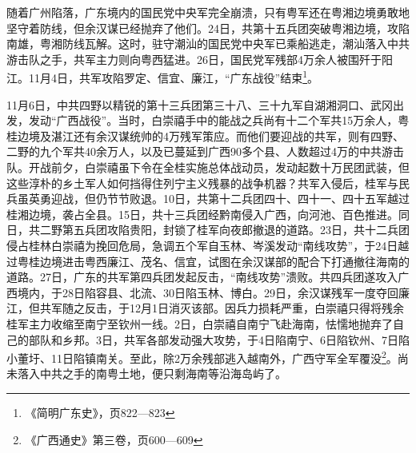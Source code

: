 随着广州陷落，广东境内的国民党中央军完全崩溃，只有粤军还在粤湘边境勇敢地坚守着防线，但余汉谋已经抛弃了他们。24日，共第十五兵团突破粤湘边境，攻陷南雄，粤湘防线瓦解。这时，驻守潮汕的国民党中央军已乘船逃走，潮汕落入中共游击队之手，共军主力则向粤西猛进。26日，国民党军残部4万余人被围歼于阳江。11月4日，共军攻陷罗定、信宜、廉江，“广东战役”结束\footnote{《简明广东史》，页822—823}。 

11月6日，中共四野以精锐的第十三兵团第三十八、三十九军自湖湘洞口、武冈出发，发动“广西战役”。当时，白崇禧手中的能战之兵尚有十二个军共15万余人，粤桂边境及湛江还有余汉谋统帅的4万残军策应。而他们要迎战的共军，则有四野、二野的九个军共40余万人，以及已蔓延到广西90多个县、人数超过4万的中共游击队。开战前夕，白崇禧虽下令在全桂实施总体战动员，发动起数十万民团武装，但这些淳朴的乡土军人如何挡得住列宁主义残暴的战争机器？共军入侵后，桂军与民兵虽英勇迎战，但仍节节败退。10日，共第十二兵团四十、四十一、四十五军越过桂湘边境，袭占全县。15日，共十三兵团经黔南侵入广西，向河池、百色推进。同日，共二野第五兵团攻陷贵阳，封锁了桂军向夜郎撤退的道路。23日，共十二兵团侵占桂林白崇禧为挽回危局，急调五个军自玉林、岑溪发动“南线攻势”，于24日越过粤桂边境进击粤西廉江、茂名、信宜，试图在余汉谋部的配合下打通撤往海南的道路。27日，广东的共军第四兵团发起反击，“南线攻势”溃败。共四兵团遂攻入广西境内，于28日陷容县、北流、30日陷玉林、博白。29日，余汉谋残军一度夺回廉江，但共军随之反击，于12月1日消灭该部。因兵力损耗严重，白崇禧只得将残余桂军主力收缩至南宁至钦州一线。2日，白崇禧自南宁飞赴海南，怯懦地抛弃了自己的部队和乡邦。3日，共军各部发动强大攻势，于4日陷南宁、6日陷钦州、7日陷小董圩、11日陷镇南关。至此，除2万余残部逃入越南外，广西守军全军覆没\footnote{《广西通史》第三卷，页600—609}。尚未落入中共之手的南粤土地，便只剩海南等沿海岛屿了。

